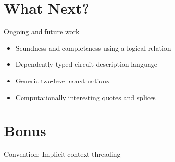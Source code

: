 \documentclass[aspectratio=169]{beamer}
\begin{document}
\section{What Next?}

\begin{frame}{Ongoing and future work}
  \begin{itemize}
    \item Soundness and completeness using a logical relation
    \item Dependently typed circuit description language
    \item Generic two-level constructions
    \item Computationally interesting quotes and splices
  \end{itemize}
\end{frame}


\section*{Bonus}


\begin{frame}{Convention: Implicit context threading}

\begin{minipage}{.45\textwidth}
\end{minipage}\hfill
\begin{minipage}{.45\textwidth}
\end{minipage}
\end{frame}
\end{document}
